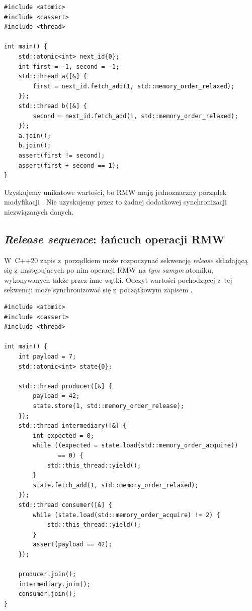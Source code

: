 \begin{lstlisting}[caption={Przydzielanie kolejnych numerów: wystarcza relaxed (C++11).}]
#include <atomic>
#include <cassert>
#include <thread>

int main() {
    std::atomic<int> next_id{0};
    int first = -1, second = -1;
    std::thread a([&] {
        first = next_id.fetch_add(1, std::memory_order_relaxed);
    });
    std::thread b([&] {
        second = next_id.fetch_add(1, std::memory_order_relaxed);
    });
    a.join();
    b.join();
    assert(first != second);
    assert(first + second == 1);
}
\end{lstlisting}

Uzyskujemy unikatowe wartości, bo RMW mają jednoznaczny porządek
modyfikacji . Nie uzyskujemy przez to żadnej dodatkowej
synchronizacji niezwiązanych danych.

\subsection{\emph{Release sequence}: łańcuch operacji RMW}

W~C++20 zapis z~porządkiem  może rozpoczynać sekwencję
\emph{release} składającą się z~następujących po nim operacji RMW
na \emph{tym samym} atomiku, wykonywanych także przez inne wątki.
Odczyt  wartości pochodzącej z~tej sekwencji może
synchronizować się z~początkowym zapisem .

\begin{lstlisting}[caption={Przekazanie publikacji przez relaxed RMW (C++20).}]
#include <atomic>
#include <cassert>
#include <thread>

int main() {
    int payload = 7;
    std::atomic<int> state{0};

    std::thread producer([&] {
        payload = 42;
        state.store(1, std::memory_order_release);
    });
    std::thread intermediary([&] {
        int expected = 0;
        while ((expected = state.load(std::memory_order_acquire))
               == 0) {
            std::this_thread::yield();
        }
        state.fetch_add(1, std::memory_order_relaxed);
    });
    std::thread consumer([&] {
        while (state.load(std::memory_order_acquire) != 2) {
            std::this_thread::yield();
        }
        assert(payload == 42);
    });

    producer.join();
    intermediary.join();
    consumer.join();
}
\end{lstlisting}

